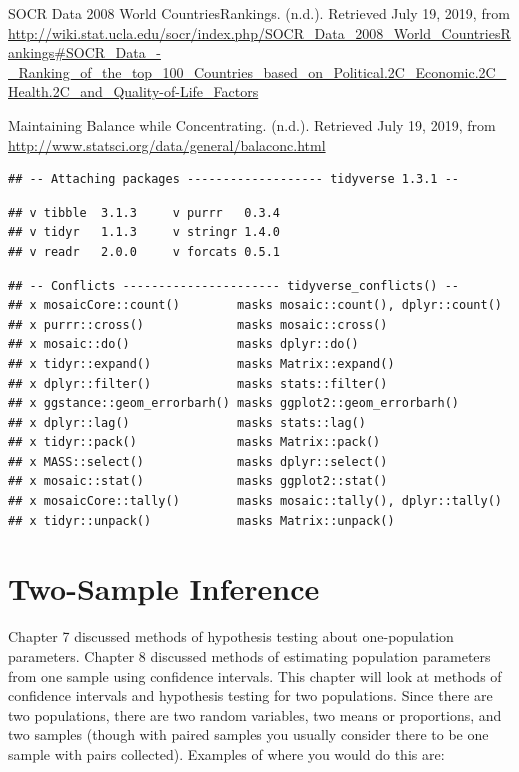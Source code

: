 \documentclass[
]{book}
\begin{document}
SOCR Data 2008 World CountriesRankings. (n.d.). Retrieved July 19, 2019, from \url{http://wiki.stat.ucla.edu/socr/index.php/SOCR_Data_2008_World_CountriesRankings\#SOCR_Data_-_Ranking_of_the_top_100_Countries_based_on_Political.2C_Economic.2C_Health.2C_and_Quality-of-Life_Factors}

Maintaining Balance while Concentrating. (n.d.). Retrieved July 19, 2019, from \url{http://www.statsci.org/data/general/balaconc.html}

\begin{verbatim}
## -- Attaching packages ------------------- tidyverse 1.3.1 --
\end{verbatim}

\begin{verbatim}
## v tibble  3.1.3     v purrr   0.3.4
## v tidyr   1.1.3     v stringr 1.4.0
## v readr   2.0.0     v forcats 0.5.1
\end{verbatim}

\begin{verbatim}
## -- Conflicts ---------------------- tidyverse_conflicts() --
## x mosaicCore::count()        masks mosaic::count(), dplyr::count()
## x purrr::cross()             masks mosaic::cross()
## x mosaic::do()               masks dplyr::do()
## x tidyr::expand()            masks Matrix::expand()
## x dplyr::filter()            masks stats::filter()
## x ggstance::geom_errorbarh() masks ggplot2::geom_errorbarh()
## x dplyr::lag()               masks stats::lag()
## x tidyr::pack()              masks Matrix::pack()
## x MASS::select()             masks dplyr::select()
## x mosaic::stat()             masks ggplot2::stat()
## x mosaicCore::tally()        masks mosaic::tally(), dplyr::tally()
## x tidyr::unpack()            masks Matrix::unpack()
\end{verbatim}

\hypertarget{two-sample-inference}{%
\chapter{Two-Sample Inference}\label{two-sample-inference}}

Chapter 7 discussed methods of hypothesis testing about one-population parameters. Chapter 8 discussed methods of estimating population parameters from one sample using confidence intervals. This chapter will look at methods of confidence intervals and hypothesis testing for two populations. Since there are two populations, there are two random variables, two means or proportions, and two samples (though with paired samples you usually consider there to be one sample with pairs collected). Examples of where you would do this are:
\end{document}

